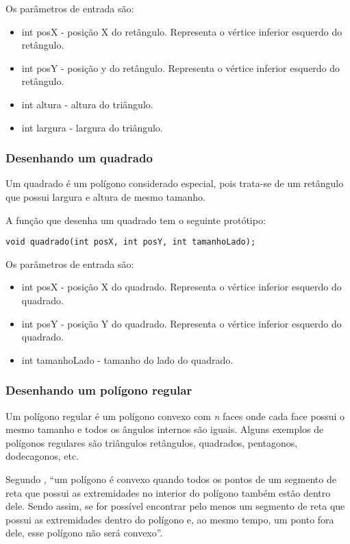 \documentclass[12pt, %
openright,
oneside, %
a4paper,    %
brazil]{facom-ufu-abntex2}
\begin{document}
Os parâmetros de entrada são:

\begin{itemize}
    \item int posX - posição X do retângulo. Representa o vértice inferior esquerdo do retângulo.
    \item int posY - posição y do retângulo. Representa o vértice inferior esquerdo do retângulo.
    \item int altura - altura do triângulo.
    \item int largura - largura do triângulo.
\end{itemize}

\subsubsection{Desenhando um quadrado}
Um quadrado é um polígono considerado especial, pois trata-se de um retângulo que possui largura e altura de mesmo tamanho.

A função que desenha um quadrado tem o seguinte protótipo:

\begin{verbatim}
void quadrado(int posX, int posY, int tamanhoLado);
\end{verbatim}

Os parâmetros de entrada são:

\begin{itemize}
    \item int posX - posição X do quadrado. Representa o vértice inferior esquerdo do quadrado.
    \item int posY - posição Y do quadrado. Representa o vértice inferior esquerdo do quadrado.
    \item int tamanhoLado - tamanho do lado do quadrado.
\end{itemize}

\subsubsection{Desenhando um polígono regular}
Um polígono regular é um polígono convexo com \textit{n} faces onde cada face possui o mesmo tamanho e todos os ângulos internos são iguais. Alguns exemplos de polígonos regulares são triângulos retângulos, quadrados, pentagonos, dodecagonos, etc.

Segundo , ``um polígono é convexo quando todos os pontos de um segmento de reta que possui as extremidades no interior do polígono também estão dentro dele. Sendo assim, se for possível encontrar pelo menos um segmento de reta que possui as extremidades dentro do polígono e, ao mesmo tempo, um ponto fora dele, esse polígono não será convexo''.
\end{document}
